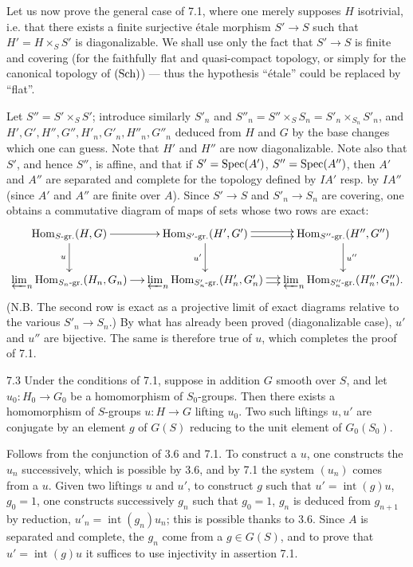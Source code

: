 Let us now prove the general case of 7.1, where one merely supposes $H$ isotrivial, i.e. that there exists a finite surjective étale morphism $S'\to S$ such that $H'=H\times_S S'$ is diagonalizable. We shall use only the fact that $S'\to S$ is finite and covering (for the faithfully flat and quasi-compact topology, or simply for the canonical topology of $\textup{(Sch)}$) --- thus the hypothesis ``étale'' could be replaced by ``flat''.

Let $S''=S'\times_S S'$; introduce similarly $S'_n$ and $S''_n=S''\times_S S_n=S'_n\times_{S_n}S'_n$, and $H',G',H'',G'',H'_n,G'_n,H''_n,G''_n$ deduced from $H$ and $G$ by the base changes which one can guess. Note that $H'$ and $H''$ are now diagonalizable. Note also that $S'$, and hence $S''$, is affine, and that if $S'=\operatorname{Spec}(A')$, $S''=\operatorname{Spec}(A'')$, then $A'$ and $A''$ are separated and complete for the topology defined by $IA'$ resp. by $IA''$ (since $A'$ and $A''$ are finite over $A$). Since $S'\to S$ and $S'_n\to S_n$ are covering, one obtains a commutative diagram of maps of sets whose two rows are exact:
\begingroup\small
\[
\xymatrix@C=12pt{
\Hom_{S\text{-}\mathrm{gr.}}(H,G)\ar[r]\ar[d]_u&\Hom_{S'\text{-}\mathrm{gr.}}(H',G')\ar@<.5ex>[r]\ar@<-.5ex>[r]\ar[d]_{u'}&\Hom_{S''\text{-}\mathrm{gr.}}(H'',G'')\ar[d]^{u''}\\
\varprojlim_n\Hom_{S_n\text{-}\mathrm{gr.}}(H_n,G_n)\ar[r]&\varprojlim_n\Hom_{S'_n\text{-}\mathrm{gr.}}(H'_n,G'_n)\ar@<.5ex>[r]\ar@<-.5ex>[r]&\varprojlim_n\Hom_{S''_n\text{-}\mathrm{gr.}}(H''_n,G''_n).}
\]
\endgroup
(N.B. The second row is exact as a projective limit of exact diagrams relative to the various $S'_n\to S_n$.) By what has already been proved (diagonalizable case), $u'$ and $u''$ are bijective. The same is therefore true of $u$, which completes the proof of 7.1.
\begin{corollary}{7.3}\label{IX.7.3}
Under the conditions of 7.1, suppose in addition $G$ smooth over $S$, and let $u_0:H_0\to G_0$ be a homomorphism of $S_0$-groups. Then there exists a homomorphism of $S$-groups $u:H\to G$ lifting $u_0$. Two such liftings $u,u'$ are conjugate by an element $g$ of $G(S)$ reducing to the unit element of $G_0(S_0)$.
\end{corollary}
Follows from the conjunction of 3.6 and 7.1. To construct a $u$, one constructs the $u_n$ successively, which is possible by 3.6, and by 7.1 the system $(u_n)$ comes from a $u$. Given two liftings $u$ and $u'$, to construct $g$ such that $u'=\operatorname{int}(g)u$, $g_0=1$, one constructs successively $g_n$ such that $g_0=1$, $g_n$ is deduced from $g_{n+1}$ by reduction, $u'_n=\operatorname{int}(g_n)u_n$; this is possible thanks to 3.6. Since $A$ is separated and complete, the $g_n$ come from a $g\in G(S)$, and to prove that $u'=\operatorname{int}(g)u$ it suffices to use injectivity in assertion 7.1.
